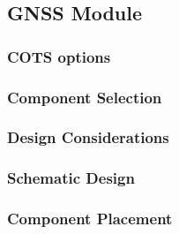 \subsection{GNSS Module}
\subsubsection{\gls{COTS} options}
\subsubsection{Component Selection}
\subsubsection{Design Considerations}
\subsubsection{Schematic Design}
\subsubsection{Component Placement}